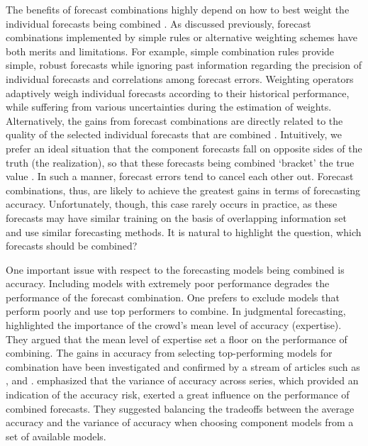 \documentclass[11pt]{article}
\begin{document}
The benefits of forecast combinations highly depend on how to best weight the individual forecasts being combined \citep{Stock2004-rq,Timmermann2006-en}. As discussed previously, forecast combinations implemented by simple rules or alternative weighting schemes have both merits and limitations. For example, simple combination rules provide simple, robust forecasts while ignoring past information regarding the precision of individual forecasts and correlations among forecast errors. Weighting operators adaptively weigh individual forecasts according to their historical performance, while suffering from various uncertainties during the estimation of weights. Alternatively, the gains from forecast combinations are directly related to the quality of the selected individual forecasts that are combined \citep{Batchelor1995-ps,Geweke2011-xk}. Intuitively, we prefer an ideal situation that the component forecasts fall on opposite sides of the truth (the realization), so that these forecasts being combined `bracket' the true value \citep{Bates1969-yj,Larrick2006-sr}. In such a manner, forecast errors tend to cancel each other out. Forecast combinations, thus, are likely to achieve the greatest gains in terms of forecasting accuracy. Unfortunately, though, this case rarely occurs in practice, as these forecasts may have similar training on the basis of overlapping information set and use similar forecasting methods. It is natural to highlight the question, which forecasts should be combined?

One important issue with respect to the forecasting models being combined is accuracy. Including models with extremely poor performance degrades the performance of the forecast combination. One prefers to exclude models that perform poorly and use top performers to combine. In judgmental forecasting, \cite{Mannes2014-dl} highlighted the importance of the crowd's mean level of accuracy (expertise). They argued that the mean level of expertise set a floor on the performance of combining. The gains in accuracy from selecting top-performing models for combination have been investigated and confirmed by a stream of articles such as \cite{Budescu2015-tu}, and \cite{Kourentzes2019-na}. \cite{Lichtendahl2020-ut} emphasized that the variance of accuracy across series, which provided an indication of the accuracy risk, exerted a great influence on the performance of combined forecasts. They suggested balancing the tradeoffs between the average accuracy and the variance of accuracy when choosing component models from a set of available models.
\end{document}

